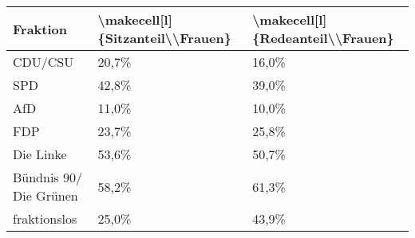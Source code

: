 
\begin{tabular}{lll}
\toprule
Fraktion & \textbackslash{}makecell[l]\{Sitzanteil\textbackslash{}\textbackslash{}Frauen\} & \textbackslash{}makecell[l]\{Redeanteil\textbackslash{}\textbackslash{}Frauen\}\\
\midrule
CDU/CSU & 20,7\% & 16,0\%\\
SPD & 42,8\% & 39,0\%\\
AfD & 11,0\% & 10,0\%\\
FDP & 23,7\% & 25,8\%\\
Die Linke & 53,6\% & 50,7\%\\
Bündnis 90/ Die Grünen & 58,2\% & 61,3\%\\
fraktionslos & 25,0\% & 43,9\%\\
\bottomrule
\end{tabular}